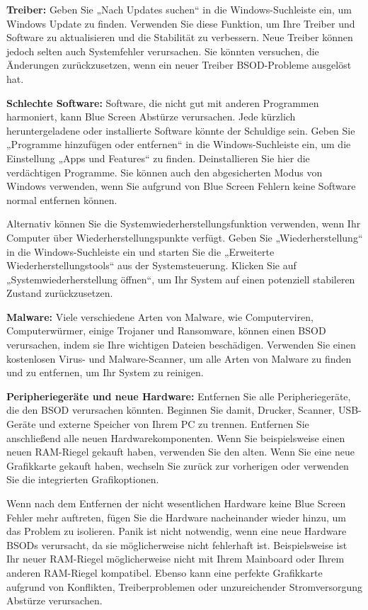 \documentclass[paper=a4,fontsize=12pt,ngerman,parskip=half]{scrartcl}
\begin{document}
\textbf{Treiber:} Geben Sie „Nach Updates suchen“ in die Windows-Suchleiste ein, um Windows Update zu finden. Verwenden Sie diese Funktion, um Ihre Treiber und Software zu aktualisieren und die Stabilität zu verbessern. Neue Treiber können jedoch selten auch Systemfehler verursachen. Sie könnten versuchen, die Änderungen zurückzusetzen, wenn ein neuer Treiber BSOD-Probleme ausgelöst hat.

\textbf{Schlechte Software:} Software, die nicht gut mit anderen Programmen harmoniert, kann Blue Screen Abstürze verursachen. Jede kürzlich heruntergeladene oder installierte Software könnte der Schuldige sein. Geben Sie „Programme hinzufügen oder entfernen“ in die Windows-Suchleiste ein, um die Einstellung „Apps und Features“ zu finden. Deinstallieren Sie hier die verdächtigen Programme. Sie können auch den abgesicherten Modus von Windows verwenden, wenn Sie aufgrund von Blue Screen Fehlern keine Software normal entfernen können.\cite{avast}

Alternativ können Sie die Systemwiederherstellungsfunktion verwenden, wenn Ihr Computer über Wiederherstellungspunkte verfügt. Geben Sie „Wiederherstellung“ in die Windows-Suchleiste ein und starten Sie die „Erweiterte Wiederherstellungstools“ aus der Systemsteuerung. Klicken Sie auf „Systemwiederherstellung öffnen“, um Ihr System auf einen potenziell stabileren Zustand zurückzusetzen.\cite{microsoft_support}

\textbf{Malware:} Viele verschiedene Arten von Malware, wie Computerviren, Computerwürmer, einige Trojaner und Ransomware, können einen BSOD verursachen, indem sie Ihre wichtigen Dateien beschädigen. Verwenden Sie einen kostenlosen Virus- und Malware-Scanner, um alle Arten von Malware zu finden und zu entfernen, um Ihr System zu reinigen.\cite{malwarebytes}

\textbf{Peripheriegeräte und neue Hardware:} Entfernen Sie alle Peripheriegeräte, die den BSOD verursachen könnten. Beginnen Sie damit, Drucker, Scanner, USB-Geräte und externe Speicher von Ihrem PC zu trennen. Entfernen Sie anschließend alle neuen Hardwarekomponenten. Wenn Sie beispielsweise einen neuen RAM-Riegel gekauft haben, verwenden Sie den alten. Wenn Sie eine neue Grafikkarte gekauft haben, wechseln Sie zurück zur vorherigen oder verwenden Sie die integrierten Grafikoptionen.\cite{microsoft_forum}

Wenn nach dem Entfernen der nicht wesentlichen Hardware keine Blue Screen Fehler mehr auftreten, fügen Sie die Hardware nacheinander wieder hinzu, um das Problem zu isolieren. Panik ist nicht notwendig, wenn eine neue Hardware BSODs verursacht, da sie möglicherweise nicht fehlerhaft ist. Beispielsweise ist Ihr neuer RAM-Riegel möglicherweise nicht mit Ihrem Mainboard oder Ihrem anderen RAM-Riegel kompatibel. Ebenso kann eine perfekte Grafikkarte aufgrund von Konflikten, Treiberproblemen oder unzureichender Stromversorgung Abstürze verursachen.\cite{avast}
\end{document}

